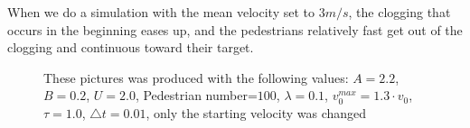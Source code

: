 When we do a simulation with the mean velocity set to $3 m/s$, the clogging
that occurs in the beginning eases up, and the pedestrians relatively fast
get out of the clogging and continuous toward their target.

\begin{figure}
\centering
{}
\caption{These pictures was produced with the following values: $A=2.2$, $B=0.2$, $U=2.0$, Pedestrian number=$100$, $\lambda=0.1$, $v^{max}_0=1.3 \cdot v_0$, $\tau = 1.0$, $\triangle t = 0.01$, only the starting velocity was changed}
\label{fig:problemSenario}
\end{figure}
